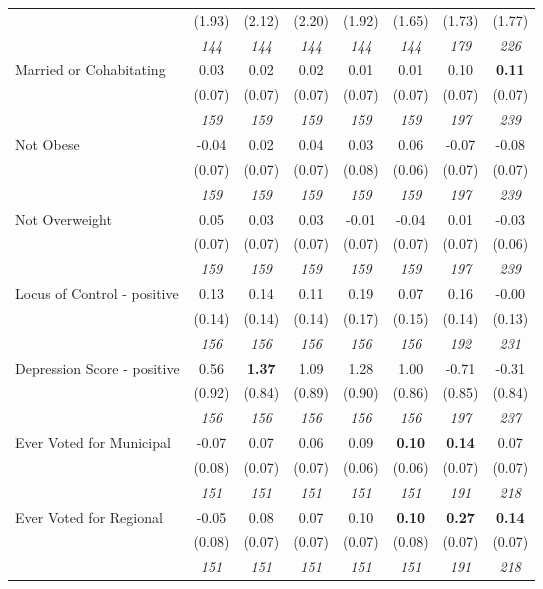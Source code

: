 \begin{tabular}{l c c c c c c c}
& (1.93) & (2.12) & (2.20) & (1.92) & (1.65) & (1.73) & (1.77) \\
& \textit{ 144 } & \textit{ 144 } & \textit{ 144 } & \textit{ 144 } & \textit{ 144 } & \textit{ 179 } & \textit{ 226 } \\
Married or Cohabitating & 0.03 & 0.02 & 0.02 & 0.01 & 0.01 & 0.10 & \textbf{0.11} \\
& (0.07) & (0.07) & (0.07) & (0.07) & (0.07) & (0.07) & (0.07) \\
& \textit{ 159 } & \textit{ 159 } & \textit{ 159 } & \textit{ 159 } & \textit{ 159 } & \textit{ 197 } & \textit{ 239 } \\
Not Obese & -0.04 & 0.02 & 0.04 & 0.03 & 0.06 & -0.07 & -0.08 \\
& (0.07) & (0.07) & (0.07) & (0.08) & (0.06) & (0.07) & (0.07) \\
& \textit{ 159 } & \textit{ 159 } & \textit{ 159 } & \textit{ 159 } & \textit{ 159 } & \textit{ 197 } & \textit{ 239 } \\
Not Overweight & 0.05 & 0.03 & 0.03 & -0.01 & -0.04 & 0.01 & -0.03 \\
& (0.07) & (0.07) & (0.07) & (0.07) & (0.07) & (0.07) & (0.06) \\
& \textit{ 159 } & \textit{ 159 } & \textit{ 159 } & \textit{ 159 } & \textit{ 159 } & \textit{ 197 } & \textit{ 239 } \\
Locus of Control - positive & 0.13 & 0.14 & 0.11 & 0.19 & 0.07 & 0.16 & -0.00 \\
& (0.14) & (0.14) & (0.14) & (0.17) & (0.15) & (0.14) & (0.13) \\
& \textit{ 156 } & \textit{ 156 } & \textit{ 156 } & \textit{ 156 } & \textit{ 156 } & \textit{ 192 } & \textit{ 231 } \\
Depression Score - positive & 0.56 & \textbf{ 1.37 } & 1.09 & 1.28 & 1.00 & -0.71 & -0.31 \\
& (0.92) & (0.84) & (0.89) & (0.90) & (0.86) & (0.85) & (0.84) \\
& \textit{ 156 } & \textit{ 156 } & \textit{ 156 } & \textit{ 156 } & \textit{ 156 } & \textit{ 197 } & \textit{ 237 } \\
Ever Voted for Municipal & -0.07 & 0.07 & 0.06 & 0.09 & \textbf{0.10} & \textbf{0.14} & 0.07 \\
& (0.08) & (0.07) & (0.07) & (0.06) & (0.06) & (0.07) & (0.07) \\
& \textit{ 151 } & \textit{ 151 } & \textit{ 151 } & \textit{ 151 } & \textit{ 151 } & \textit{ 191 } & \textit{ 218 } \\
Ever Voted for Regional & -0.05 & 0.08 & 0.07 & 0.10 & \textbf{0.10} & \textbf{0.27} & \textbf{0.14} \\
& (0.08) & (0.07) & (0.07) & (0.07) & (0.08) & (0.07) & (0.07) \\
& \textit{ 151 } & \textit{ 151 } & \textit{ 151 } & \textit{ 151 } & \textit{ 151 } & \textit{ 191 } & \textit{ 218 } \\
\bottomrule
\end{tabular}
